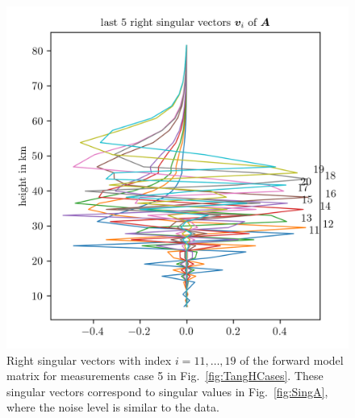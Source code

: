 \begin{figure}[ht!]
	\centering
	\includegraphics{MiddleVecA.png}
	\caption[Right singular vectors 11 to 19 of forward model.]{Right singular vectors with index $i = 11,\dots, 19$ of the forward model matrix for measurements case 5 in Fig.~\ref{fig:TangHCases}.
		These singular vectors correspond to singular values in Fig.~\ref{fig:SingA}, where the noise level is similar to the data.}
	\label{fig:middleSpace}
\end{figure}
